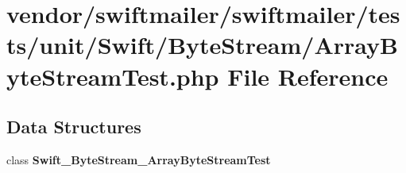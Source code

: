 \section{vendor/swiftmailer/swiftmailer/tests/unit/\+Swift/\+Byte\+Stream/\+Array\+Byte\+Stream\+Test.php File Reference}
\label{_array_byte_stream_test_8php}
\subsection*{Data Structures}
\begin{DoxyCompactItemize}
\item 
class {\bf Swift\+\_\+\+Byte\+Stream\+\_\+\+Array\+Byte\+Stream\+Test}
\end{DoxyCompactItemize}
